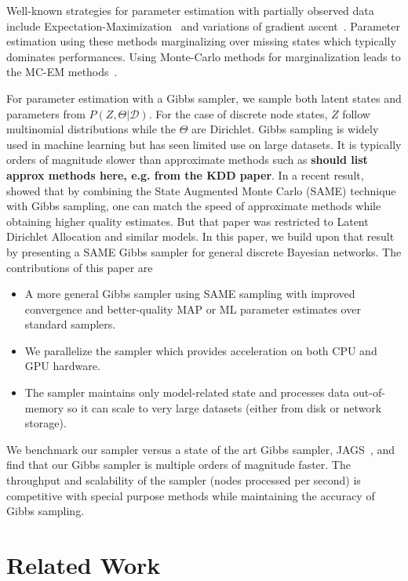 \documentclass{article} %
\begin{document}
Well-known strategies for parameter estimation with partially observed
data include Expectation-Maximization~\citep{EMpaper} and variations
of gradient ascent~\citep{Thiesson95}.  Parameter estimation using
these methods marginalizing over missing states which typically
dominates performances. Using Monte-Carlo methods for marginalization
leads to the MC-EM methods~\citep{MC-EM}.

For parameter estimation with a Gibbs sampler, we sample both latent
states and parameters from $P(Z,\Theta|\mathcal{D})$.  For the case of
discrete node states, $Z$ follow multinomial distributions while the
$\Theta$ are Dirichlet. Gibbs sampling is widely used in machine
learning but has seen limited use on large datasets.  It is typically
orders of magnitude slower than approximate methods such as {\bf
  should list approx methods here, e.g.  from the KDD paper}. In a
recent result,~\citet{SAME2015} showed that by combining the State
Augmented Monte Carlo (SAME) technique~\citep{SAME2002} with Gibbs
sampling, one can match the speed of approximate methods while
obtaining higher quality estimates. But that paper was restricted to
Latent Dirichlet Allocation and similar models.  In this paper, we
build upon that result by presenting a SAME Gibbs sampler for general
discrete Bayesian networks. The contributions of this paper are

\begin{itemize}[noitemsep]
    \item A more general Gibbs sampler using SAME sampling with improved convergence and better-quality MAP or ML parameter
      estimates over standard samplers.
    \item We parallelize the sampler which provides acceleration on both CPU and GPU
      hardware.
    \item The sampler maintains only model-related state and processes data out-of-memory
      so it can scale to very large datasets (either from disk or network storage).
\end{itemize}

We benchmark our sampler versus a state of the art Gibbs sampler,
JAGS~\citep{JAGS2003}, and find that our Gibbs sampler is multiple
orders of magnitude faster. The throughput and scalability of the
sampler (nodes processed per second) is competitive with special
purpose methods while maintaining the accuracy of Gibbs sampling.


\section{Related Work}\label{sec:related_work}
\end{document}
